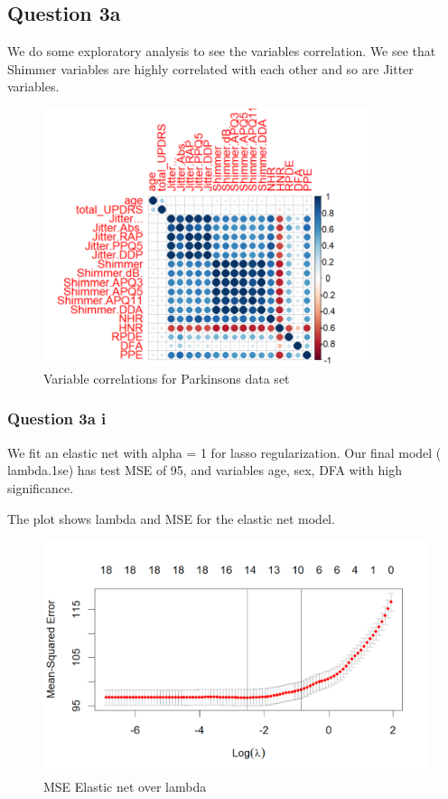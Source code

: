 \documentclass[
]{article}
\begin{document}
\hypertarget{question-3a}{%
\subsection{Question 3a}\label{question-3a}}

We do some exploratory analysis to see the variables correlation. 
We see
that Shimmer variables are highly correlated with each other and so are
Jitter variables.

\begin{figure}
\centering
\includegraphics[width=3.76042in,height=\textheight]{corr_parkinsons.png}
\caption{Variable correlations for Parkinsons data set}
\end{figure}

\hypertarget{question-3a-i}{%
\subsubsection{Question 3a i}\label{question-3a-i}}

We fit an elastic net with alpha = 1 for lasso regularization. Our final
model ( lambda.1se) has test MSE of 95, and variables age, sex, DFA with
high significance.

The plot shows lambda and MSE for the elastic net model.

\begin{figure}
\centering
\includegraphics[width=4.85417in,height=\textheight]{mse_elastic_net.png}
\caption{MSE Elastic net over lambda}
\end{figure}
\end{document}
